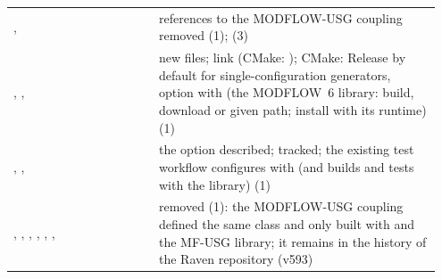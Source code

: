\begin{longtable}{P{0.32\linewidth}P{0.628\linewidth}}
,  & references to the MODFLOW-USG coupling removed (1);  (3)\\
, ,  & new files; link  (CMake: ); CMake: Release by default for single-configuration generators, option  with  (the MODFLOW~6 library: build, download or given path; install with its runtime) (1)\\
, ,  & the  option described;  tracked; the existing test workflow configures with  (and  builds and tests with the library) (1)\\
, , , , , ,  & removed (1): the MODFLOW-USG coupling defined the same  class and only built with  and the MF-USG library; it remains in the history of the Raven repository (v593)\\\bottomrule
\end{longtable}

